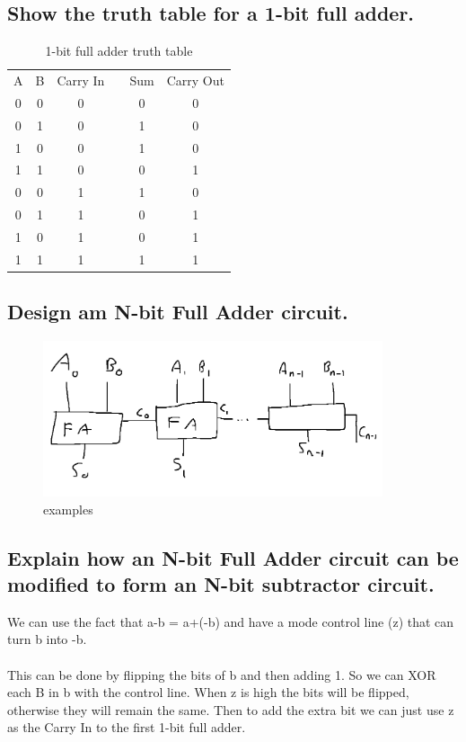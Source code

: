\documentclass{article}
\begin{document}
\subsection{Show the truth table for a 1-bit full adder.}
\begin{table}[h]
    \centering
    \begin{tabular}{|c|c|c|c|c|c|}
        A & B & Carry In & & Sum & Carry Out \\
        0 & 0 & 0 & & 0 & 0\\
        0 & 1 & 0 & & 1 & 0\\
        1 & 0 & 0 & & 1 & 0\\
        1 & 1 & 0 & & 0 & 1\\
        0 & 0 & 1 & & 1 & 0\\
        0 & 1 & 1 & & 0 & 1\\
        1 & 0 & 1 & & 0 & 1\\
        1 & 1 & 1 & & 1 & 1
    \end{tabular}
    \caption{1-bit full adder truth table}
    \label{tab:my_label}
\end{table}

\subsection{Design am N-bit Full Adder circuit.}
\begin{figure}[h]
    \centering
    \includegraphics[width=100mm]{digitalLogic4.PNG}
    \caption{examples}
    \label{fig:my_label}
\end{figure}

\subsection{Explain how an N-bit Full Adder circuit can be modified to form an N-bit subtractor circuit.}
We can use the fact that a-b = a+(-b) and have a mode control line (z) that can turn b into -b.\\\\
This can be done by flipping the bits of b and then adding 1. So we can XOR each B in b with the control line. When z is high the bits will be flipped, otherwise they will remain the same. Then to add the extra bit we can just use z as the Carry In to the first 1-bit full adder.
\newpage
\end{document}
